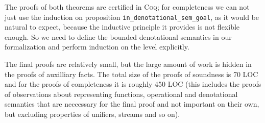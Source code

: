 The proofs of both theorems are certified in \textsc{Coq}; for completeness we can not just use the induction on proposition \lstinline|in_denotational_sem_goal|, as it would be natural to expect,
because the inductive principle it provides is not flexible enough. So we need to define the bounded denotational semantics in our formalization and perform
induction on the level explicitly.

{ \color{blue}
  The final proofs are relatively small, but the large amount of work is hidden in the proofs of auxilliary facts. The total size of the proofs of soundness is 70 LOC and for the proofs of
  completeness it is roughly 450 LOC (this includes the proofs of observations about representing functions, operational and denotational semantics that are neccessary for the final proof
  and not important on their own, but excluding properties of unifiers, streams and so on).
}

\begin{comment}
\begin{lstlisting}[language=Coq,morekeywords={where,at,level}]
  Reserved Notation "[| n | g , f |]" (at level 0).
  Inductive in_denotational_sem_lev_goal :
    nat -> goal -> repr_fun -> Prop :=
    ...
  | dslgInvoke : forall l r t f,
      [| l  | proj1_sig (Prog r) t , f |] ->
      [| S l | Invoke r t , f |]
  where "[| n | g , f |]" :=
    (in_denotational_sem_lev_goal n g f).
\end{lstlisting}

Recall that the environment ``\lstinline[language=Coq]|Prog|'' maps every relational symbol to the definition of relation,
which is a pair of a function from terms to goals and a proof that it is closed and consistent.
So ``\lstinline[language=Coq]|(proj1_sig (Prog r) t)|'' here simply takes the body of the corresponding relation.

The lemma relating bounded and unbounded denotational semantics in \textsc{Coq} looks as follows:

\begin{lstlisting}[language=Coq] 
  Lemma in_denotational_sem_some_lev:
    forall (g : goal) (f : repr_fun),
      [| g , f |] -> exists l, [| l | g , f |].
\end{lstlisting}

The statements of the theorems are as follows:

\begin{lstlisting}[language=Coq]]
  Theorem search_correctness:
    forall (g : goal) (k : nat) (f : repr_fun) (t : trace),
      closed_goal_in_context (first_nats k) g) ->
      op_sem (State (Leaf g empty_subst k)) t) ->
      {| t , f |} ->
      [| g , f |].
  Theorem search_completeness:
    forall (g : goal) (k : nat) (f : repr_fun) (t : trace),
      consistent_goal g ->
      closed_goal_in_context (first_nats k) g ->
      op_sem (State (Leaf g empty_subst k)) t ->
      [| g , f |] ->
      exists (f' : repr_fun),
        {| t , f' |} /\
        forall (x : var), In x (first_nats k) -> f x = f' x.
\end{lstlisting}
\end{comment}
